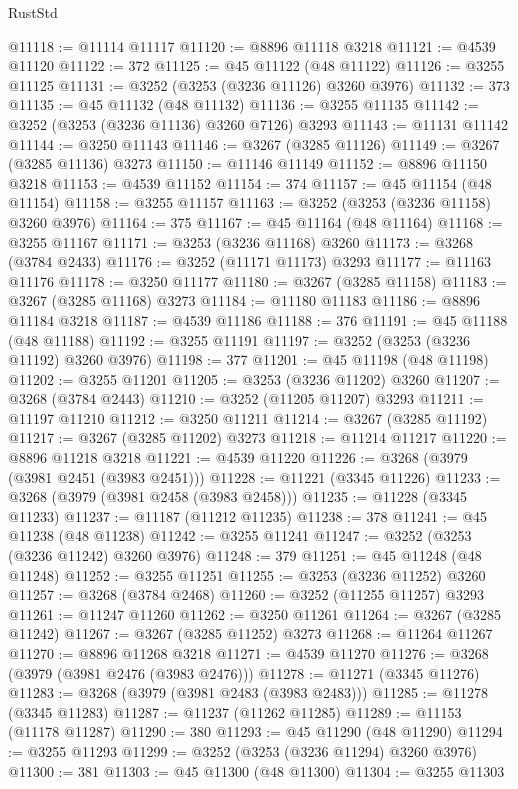 \begin{lexlean}{RustStd}
\begin{coremodule}
@11118 := @11114 @11117
@11120 := @8896 @11118 @3218
@11121 := @4539 @11120
@11122 := 372
@11125 := @45 @11122 (@48 @11122)
@11126 := @3255 @11125
@11131 := @3252 (@3253 (@3236 @11126) @3260 @3976)
@11132 := 373
@11135 := @45 @11132 (@48 @11132)
@11136 := @3255 @11135
@11142 := @3252 (@3253 (@3236 @11136) @3260 @7126) @3293
@11143 := @11131 @11142
@11144 := @3250 @11143
@11146 := @3267 (@3285 @11126)
@11149 := @3267 (@3285 @11136) @3273
@11150 := @11146 @11149
@11152 := @8896 @11150 @3218
@11153 := @4539 @11152
@11154 := 374
@11157 := @45 @11154 (@48 @11154)
@11158 := @3255 @11157
@11163 := @3252 (@3253 (@3236 @11158) @3260 @3976)
@11164 := 375
@11167 := @45 @11164 (@48 @11164)
@11168 := @3255 @11167
@11171 := @3253 (@3236 @11168) @3260
@11173 := @3268 (@3784 @2433)
@11176 := @3252 (@11171 @11173) @3293
@11177 := @11163 @11176
@11178 := @3250 @11177
@11180 := @3267 (@3285 @11158)
@11183 := @3267 (@3285 @11168) @3273
@11184 := @11180 @11183
@11186 := @8896 @11184 @3218
@11187 := @4539 @11186
@11188 := 376
@11191 := @45 @11188 (@48 @11188)
@11192 := @3255 @11191
@11197 := @3252 (@3253 (@3236 @11192) @3260 @3976)
@11198 := 377
@11201 := @45 @11198 (@48 @11198)
@11202 := @3255 @11201
@11205 := @3253 (@3236 @11202) @3260
@11207 := @3268 (@3784 @2443)
@11210 := @3252 (@11205 @11207) @3293
@11211 := @11197 @11210
@11212 := @3250 @11211
@11214 := @3267 (@3285 @11192)
@11217 := @3267 (@3285 @11202) @3273
@11218 := @11214 @11217
@11220 := @8896 @11218 @3218
@11221 := @4539 @11220
@11226 := @3268 (@3979 (@3981 @2451 (@3983 @2451)))
@11228 := @11221 (@3345 @11226)
@11233 := @3268 (@3979 (@3981 @2458 (@3983 @2458)))
@11235 := @11228 (@3345 @11233)
@11237 := @11187 (@11212 @11235)
@11238 := 378
@11241 := @45 @11238 (@48 @11238)
@11242 := @3255 @11241
@11247 := @3252 (@3253 (@3236 @11242) @3260 @3976)
@11248 := 379
@11251 := @45 @11248 (@48 @11248)
@11252 := @3255 @11251
@11255 := @3253 (@3236 @11252) @3260
@11257 := @3268 (@3784 @2468)
@11260 := @3252 (@11255 @11257) @3293
@11261 := @11247 @11260
@11262 := @3250 @11261
@11264 := @3267 (@3285 @11242)
@11267 := @3267 (@3285 @11252) @3273
@11268 := @11264 @11267
@11270 := @8896 @11268 @3218
@11271 := @4539 @11270
@11276 := @3268 (@3979 (@3981 @2476 (@3983 @2476)))
@11278 := @11271 (@3345 @11276)
@11283 := @3268 (@3979 (@3981 @2483 (@3983 @2483)))
@11285 := @11278 (@3345 @11283)
@11287 := @11237 (@11262 @11285)
@11289 := @11153 (@11178 @11287)
@11290 := 380
@11293 := @45 @11290 (@48 @11290)
@11294 := @3255 @11293
@11299 := @3252 (@3253 (@3236 @11294) @3260 @3976)
@11300 := 381
@11303 := @45 @11300 (@48 @11300)
@11304 := @3255 @11303

\end{coremodule}
\end{lexlean}
